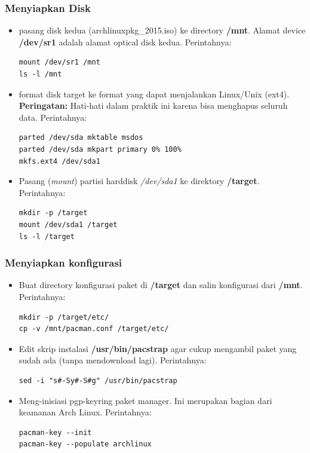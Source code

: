 \documentclass[12pt,]{article}
\begin{document}
	\subsubsection{Menyiapkan Disk}
	\begin{itemize}
		\item pasang disk kedua (archlinuxpkg\_2015.iso) ke directory \textbf{/mnt}.
		Alamat device \textbf{/dev/sr1} adalah alamat optical disk kedua.
		Perintahnya:
		\begin{verbatim}
mount /dev/sr1 /mnt
ls -l /mnt
		\end{verbatim}

		\item format disk target ke format yang dapat menjalankan Linux/Unix (ext4).
		\textbf{Peringatan:} Hati-hati dalam praktik ini karena bisa menghapus seluruh data.
		Perintahnya:
		\begin{verbatim}
parted /dev/sda mktable msdos
parted /dev/sda mkpart primary 0% 100%
mkfs.ext4 /dev/sda1
		\end{verbatim}

		\item Pasang (\textit{mount}) partisi harddisk \textit{/dev/sda1} ke direktory \textbf{/target}.
		Perintahnya:
		\begin{verbatim}
mkdir -p /target
mount /dev/sda1 /target
ls -l /target
		\end{verbatim}
	\end{itemize}

	\subsubsection{Menyiapkan konfigurasi}
	\begin{itemize}
		\item Buat directory konfigurasi paket di \textbf{/target} dan salin konfigurasi dari \textbf{/mnt}.
		Perintahnya:
		\begin{verbatim}
mkdir -p /target/etc/
cp -v /mnt/pacman.conf /target/etc/
		\end{verbatim}

		\item Edit skrip instalasi \textbf{/usr/bin/pacstrap} agar cukup mengambil paket yang sudah ada (tanpa mendownload lagi).
		Perintahnya:
		\begin{verbatim}
sed -i "s#-Sy#-S#g" /usr/bin/pacstrap
		\end{verbatim}

		\item Meng-inisiasi pgp-keyring paket manager. Ini merupakan bagian dari keamanan Arch Linux.
		Perintahnya:
		\begin{verbatim}
pacman-key --init
pacman-key --populate archlinux
		\end{verbatim}
	\end{itemize}
\end{document}

